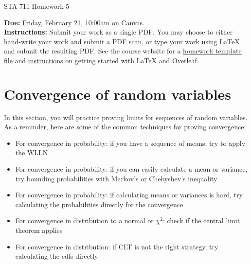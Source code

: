 \documentclass[11pt]{article}
\begin{document}
\begin{center}
\Large
STA 711 Homework 5\\
\normalsize
\vspace{5mm}
\end{center}

\noindent \textbf{Due:} Friday, February 21, 10:00am on Canvas.\\ 

\noindent \textbf{Instructions:} Submit your work as a single PDF. You may choose to either hand-write your work and submit a PDF scan, or type your work using LaTeX and submit the resulting PDF. See the course website for a \href{https://sta711-s25.github.io/homework/hw_template.tex}{homework template file} and \href{https://sta711-s25.github.io/homework/latex_instructions/}{instructions} on getting started with LaTeX and Overleaf.

\section*{Convergence of random variables}

In this section, you will practice proving limits for sequences of random variables. As a reminder, here are some of the common techniques for proving convergence:

\begin{itemize}
\item For convergence in probability: if you have a sequence of means, try to apply the WLLN
\item For convergence in probability: if you can easily calculate a mean or variance, try bounding probabilities with Markov's or Chebyshev's inequality
\item For convergence in probability: if calculating means or variances is hard, try calculating the probabilities directly for the convergence
\item For convergence in distribution to a normal or $\chi^2$: check if the central limit theorem applies
\item For convergence in distribution: if CLT is not the right strategy, try calculating the cdfs directly
\end{itemize}

\vspace{1cm}
\end{document}
